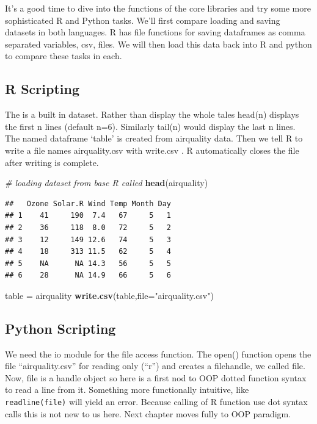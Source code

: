 \documentclass[]{book}
\newenvironment{Shaded}{\begin{snugshade}}{\end{snugshade}}
\newcommand{\KeywordTok}[1]{\textcolor[rgb]{0.13,0.29,0.53}{\textbf{#1}}}
\newcommand{\DataTypeTok}[1]{\textcolor[rgb]{0.13,0.29,0.53}{#1}}
\newcommand{\StringTok}[1]{\textcolor[rgb]{0.31,0.60,0.02}{#1}}
\newcommand{\CommentTok}[1]{\textcolor[rgb]{0.56,0.35,0.01}{\textit{#1}}}
\newcommand{\NormalTok}[1]{#1}
\theoremstyle{definition}
\theoremstyle{definition}
\theoremstyle{definition}
\theoremstyle{remark}
\begin{document}
It's a good time to dive into the functions of the core libraries and
try some more sophisticated R and Python tasks. We'll first compare
loading and saving datasets in both languages. R has file functions for
saving dataframes as comma separated variables, csv, files. We will then
load this data back into R and python to compare these tasks in each.

\subsection{R Scripting}\label{r-scripting-3}

The   is a built in dataset. Rather
than display the whole tales head(n)  displays the first
n lines (default n=6). Similarly tail(n)  would display
the last n lines. The named dataframe `table' is created from airquality
data. Then we tell R to write a file names airquality.csv with write.csv
. R automatically closes the file after writing is
complete.

\begin{Shaded}
\begin{Highlighting}[]
\CommentTok{# loading dataset from base R called }
\KeywordTok{head}\NormalTok{(airquality)}
\end{Highlighting}
\end{Shaded}

\begin{verbatim}
##   Ozone Solar.R Wind Temp Month Day
## 1    41     190  7.4   67     5   1
## 2    36     118  8.0   72     5   2
## 3    12     149 12.6   74     5   3
## 4    18     313 11.5   62     5   4
## 5    NA      NA 14.3   56     5   5
## 6    28      NA 14.9   66     5   6
\end{verbatim}

\begin{Shaded}
\begin{Highlighting}[]
\NormalTok{table =}\StringTok{ }\NormalTok{airquality}
\KeywordTok{write.csv}\NormalTok{(table,}\DataTypeTok{file=}\StringTok{"airquality.csv"}\NormalTok{)}
\end{Highlighting}
\end{Shaded}

\subsection{Python Scripting}\label{python-scripting-3}

We need the io module for the file access function. The open() function
opens the file ``airquality.csv'' for reading only (``r'') and creates a
filehandle, we called file. Now, file is a handle object so here is a
first nod to OOP dotted function syntax to read a line from it.
Something more functionally intuitive, like \texttt{readline(file)} will
yield an error. Because calling of R function use dot syntax calls this
is not new to us here. Next chapter moves fully to OOP paradigm.
\end{document}
